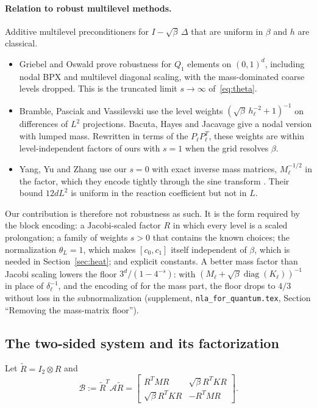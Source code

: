 \documentclass[11pt,a4paper]{article}
\newcommand{\A}{\mathcal{A}}
\newcommand{\B}{\mathcal{B}}
\newcommand{\Rt}{\widetilde R}
\theoremstyle{remark}
\begin{document}
\paragraph{Relation to robust multilevel methods.} Additive multilevel
preconditioners for $I-\sqrt\beta\,\Delta$ that are uniform in $\beta$ and $h$ are
classical.
\begin{itemize}
\item Griebel and Oswald \cite[Thms.~1--2]{GO95} prove robustness for
  $Q_1$ elements on $(0,1)^d$, including nodal BPX and multilevel diagonal
  scaling, with the mass-dominated coarse levels dropped. This is the
  truncated limit $s\to\infty$ of~\eqref{eq:theta}.
\item Bramble, Pasciak and Vassilevski \cite{BPV00} use the level weights
  $(\sqrt\beta\,h_\ell^{-2}+1)^{-1}$ on differences of $L^2$ projections. Bacuta, Hayes and
  Jacavage \cite{BHJ21} give a nodal version with lumped mass. Rewritten
  in terms of the $P_\ell P_\ell^T$, these weights are within level-independent
  factors of ours with $s=1$ when the grid resolves $\beta$.
\item Yang, Yu and Zhang \cite[Thm.~2.1]{YYZ26} use our $s=0$ with exact
  inverse mass matrices, $M_\ell^{-1/2}$ in the factor, which they encode
  tightly through the sine transform \cite[Secs.~3.4--3.5]{YYZ26}. Their bound
  $12dL^2$ is uniform in the reaction coefficient but not in $L$.
\end{itemize}
Our contribution is therefore not robustness as such. It is the form
required by the block encoding: a Jacobi-scaled factor $R$ in which every
level is a scaled prolongation; a family of weights $s>0$ that contains
the known choices; the normalization $\theta_L=1$, which makes $[c_0,c_1]$
itself independent of $\beta$, which is needed in Section~\ref{sec:heat};
and explicit constants. A better mass factor than Jacobi scaling lowers
the floor $3^d/(1-4^{-s})$: with $(M_\ell+\sqrt\beta\operatorname{diag}(K_\ell))^{-1}$ in place of
$\delta_\ell^{-1}$, and the encoding of \cite{YYZ26} for the mass part, the floor
drops to $4/3$ without loss in the subnormalization (supplement,
\texttt{nla\_for\_quantum.tex}, Section ``Removing the mass-matrix floor'').

\subsection{The two-sided system and its factorization}

Let $\Rt=I_2\otimes R$ and
\begin{equation}\label{eq:B}
\B:=\Rt^T\A\Rt=\begin{bmatrix}R^TMR & \sqrt\beta R^TKR\\ \sqrt\beta R^TKR & -R^TMR\end{bmatrix}.
\end{equation}
\end{document}
